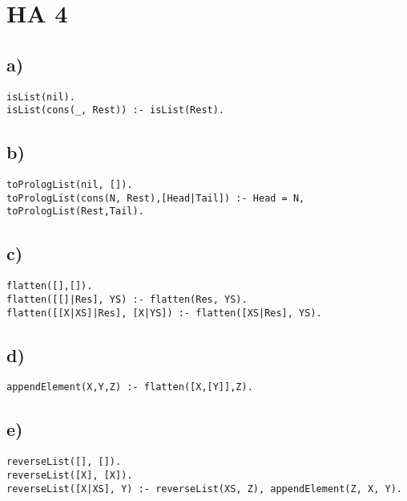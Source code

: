 \documentclass[a4paper]{article}
\begin{document}
\section*{ HA 4 }
\subsection*{a)}
\begin{lstlisting}
isList(nil).
isList(cons(_, Rest)) :- isList(Rest).
\end{lstlisting}


\subsection*{b)}
\begin{lstlisting}
toPrologList(nil, []).
toPrologList(cons(N, Rest),[Head|Tail]) :- Head = N, toPrologList(Rest,Tail). 
\end{lstlisting}


\subsection*{c)}
\begin{lstlisting}
flatten([],[]).
flatten([[]|Res], YS) :- flatten(Res, YS).
flatten([[X|XS]|Res], [X|YS]) :- flatten([XS|Res], YS).
\end{lstlisting}


\subsection*{d)}
\begin{lstlisting}
appendElement(X,Y,Z) :- flatten([X,[Y]],Z).
\end{lstlisting}


\subsection*{e)}
\begin{lstlisting}
reverseList([], []).
reverseList([X], [X]).
reverseList([X|XS], Y) :- reverseList(XS, Z), appendElement(Z, X, Y).

\end{lstlisting}
\end{document}
